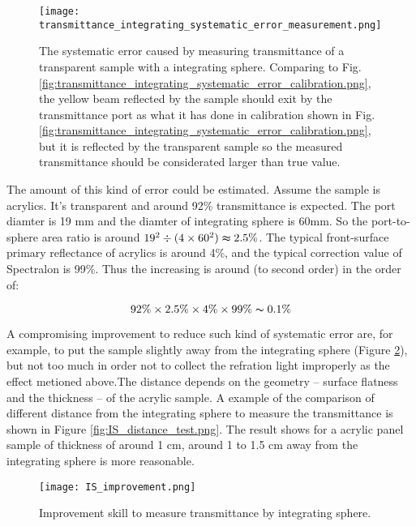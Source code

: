 \begin{figure}
    \centering
    \texttt{[image: transmittance\_integrating\_systematic\_error\_measurement.png]}
    \caption[Transmittance measurement of the integrating sphere error attributed by transparent sample.]
{The systematic error caused by measuring transmittance of a transparent sample with a integrating sphere.
Comparing to Fig. \ref{fig:transmittance_integrating_systematic_error_calibration.png}, the yellow beam reflected by the sample
should exit by the transmittance port as what it has done in calibration shown
in Fig. \ref{fig:transmittance_integrating_systematic_error_calibration.png}, but it is reflected by the transparent sample so
the measured transmittance should be considerated larger than true value.}
    \label{fig:transmittance_integrating_systematic_error_measurement.png}
    \end{figure}

The amount of this kind of error could be estimated. Assume the sample is acrylics. It's transparent and around 92\% transmittance
is expected. The port diamter is 19 mm and the diamter of integrating sphere is 60mm.
So the port-to-sphere area ratio is around ${19^2}\div({4\times60^2})\thickapprox2.5\%$.
The typical front-surface primary reflectance of acrylics is around 4\%, and the typical correction value of Spectralon is 99\%.
Thus the increasing is around (to second order) in the order of:


\begin{equation}
\label{eq:ISError}
92\%\times2.5\%\times4\%\times99\%\thicksim0.1\%
\end{equation}


A compromising improvement to reduce such kind of systematic error are, for example,
to put the sample slightly away from the integrating sphere (Figure \ref{fig:IS_improvement.png}), but not too much in
order not to collect the refration light improperly as the effect metioned above.The distance depends on the geometry -- surface flatness and
the thickness -- of the acrylic sample.  A example of the comparison of different distance from
the integrating sphere to measure the transmittance is shown in Figure \ref{fig:IS_distance_test.png}. The result shows for a acrylic panel
sample of thickness of around 1 cm, around 1 to 1.5 cm away from the integrating sphere is more reasonable.


\begin{figure}
    \centering
    \texttt{[image: IS\_improvement.png]}
    \caption{Improvement skill to measure transmittance by integrating sphere.}
    \label{fig:IS_improvement.png}
    \end{figure}


